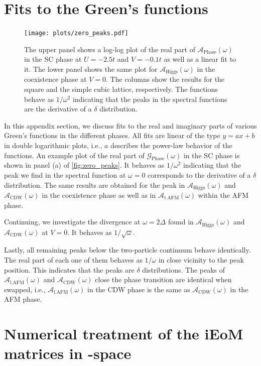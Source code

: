 \documentclass[
    reprint, 
    aps,
    preprintnumbers,
    twocolumn,
    prb,
    superscriptaddress
]{revtex4-2}
\newcommand{\greens}[1]{\mathcal{G}_\text{#1} (\omega)}
\newcommand{\spectral}[1]{\mathcal{A}_\text{#1}  (\omega)}
\def\hmath$#1${\texorpdfstring{{\rmfamily\textit{#1}}}{#1}}
\begin{document}
\section{Fits to the Green's functions}
\label{sec:fit_greens_functions}

\begin{figure}
    \centering
    \texttt{[image: plots/zero\_peaks.pdf]}
    \caption{The upper panel shows a log-log plot of the real part of $\spectral{Phase}$ in the SC phase at $U=-2.5t$ and $V=-0.1t$ as well as a linear fit to it.
    The lower panel shows the same plot for $\spectral{Higgs}$ in the coexistence phase at $V=0$. The columns show the results for the square and the simple cubic lattice, respectively.
    The functions behave as $1/\omega^2$ indicating that the peaks in the spectral functions are the derivative of a $\delta$ distribution.}
    \label{fig:zero_peaks}
\end{figure}

In this appendix section, we discuss fits to the real and imaginary parts of various Green's functions in the different phases.
All fits are linear of the type $y = ax + b$ in double logarithmic plots, i.e., $a$ describes the power-law behavior of the functions.
An example plot of the real part of $\greens{Phase}$ in the SC phase is shown in panel (a) of \autoref{fig:zero_peaks}.
It behaves as $1/\omega^2$ indicating that the peak we find in the spectral function at $\omega=0$ corresponds to the derivative of a $\delta$ distribution.
The same results are obtained for the peak in $\spectral{Higgs}$ and $\spectral{CDW}$ in the coexistence phase as well as in $\spectral{t.AFM}$ within the AFM phase.

Continuing, we investigate the divergence at $\omega = 2\Delta$ found in $\spectral{Higgs}$ and $\spectral{CDW}$ at $V=0$. It behaves as $1/\sqrt{\omega}$.

Lastly, all remaining peaks below the two-particle continuum behave identically.
The real part of each one of them behaves as $1/\omega$ in close vicinity to the peak position.
This indicates that the peaks are $\delta$ distributions.
The peaks of $\spectral{l.AFM}$ and $\spectral{CDW}$ close the phase transition are identical when swapped, 
i.e., $\spectral{l.AFM}$ in the CDW phase is the same as $\spectral{CDW}$ in the AFM phase.

\section{Numerical treatment of the iEoM matrices in \hmath $\gamma$-space}
\label{sec:numerical_ieom}
\end{document}
